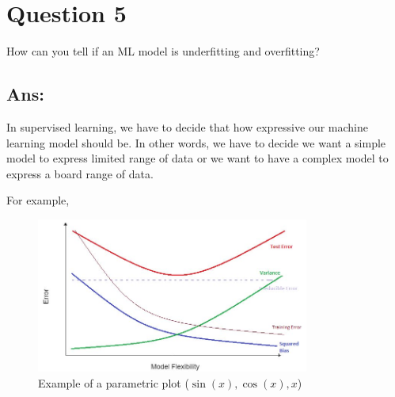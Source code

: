 \documentclass{kthreport}
\begin{document}
\section{Question 5}
How can you tell if an ML model is underfitting and overfitting?

\subsection*{Ans:}

In supervised learning, we have to decide that how expressive our machine learning
model should be. In other words, we have to decide we want a simple model to express
limited range of data or we want to have a complex model to express a board range
of data.

For example,


\begin{figure}[h]
    \centering
    \includegraphics[width=0.8\textwidth]{figs/bias-var-trade.jpg}
    \caption{Example of a parametric plot ($\sin (x), \cos(x), x$)}
    \label{fig:bias-vars-tradeoff}
\end{figure}
\medskip



\end{document}

